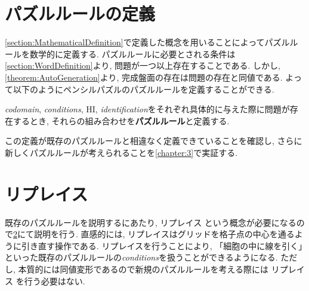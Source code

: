 \section{パズルルールの定義}\label{section:PuzzleRuleDefinition}
\cref{section:MathematicalDefinition}で定義した概念を用いることによってパズルルールを数学的に定義する. パズルルールに必要とされる条件は\cref{section:WordDefinition}より, 問題が一つ以上存在することである. しかし, \cref{theorem:AutoGeneration}より, 完成盤面の存在は問題の存在と同値である. よって以下のようにペンシルパズルのパズルルールを定義することができる.
\begin{definition}[パズルルール]\label{definition:PuzzleRule}
  \textit{codomain}, \textit{conditions}, HI, \textit{identification}をそれぞれ具体的に与えた際に問題が存在するとき, それらの組み合わせを\textbf{パズルルール}と定義する.
\end{definition}
この定義が既存のパズルルールと相違なく定義できていることを確認し, さらに新しくパズルルールが考えられることを\cref{chapter:3}で実証する.

\section{リプレイス
 }\label{section:Replace}
既存のパズルルールを説明するにあたり, リプレイス
という概念が必要になるので\cref{section:Replace}にて説明を行う. 直感的には, リプレイスはグリッドを格子点の中心を通るように引き直す操作である.
リプレイスを行うことにより, 「細胞の中に線を引く」といった既存のパズルルールの\textit{conditions}を扱うことができるようになる.
ただし, 本質的には同値変形であるので新規のパズルルールを考える際には
リプレイス
を行う必要はない.

